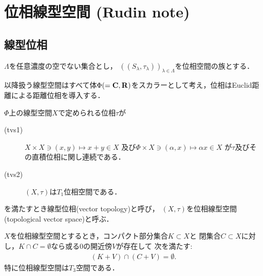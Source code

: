 \section{位相線型空間 (Rudin note)}
\subsection{線型位相}
	\begin{screen}
		\begin{thm}[多変数連続写像は一変数写像として連続]
		\label{thm:multivariable_continuous_mapping_is_one_variable_continuous}
			$\Lambda$を任意濃度の空でない集合とし，
			$\left( (S_\lambda,\tau_\lambda) \right)_{\lambda \in \Lambda}$を位相空間の族とする．
			
		\end{thm}
	\end{screen}
	
	以降扱う線型空間はすべて体$\Phi (=\mathbf{C},\mathbf{R})$をスカラーとして考え，位相はEuclid距離による距離位相を導入する．
	
	\begin{screen}
		\begin{dfn}[位相線型空間]\label{def:topological_vector_space}
			$\Phi$上の線型空間$X$で定められる位相$\tau$が
			\begin{description}
				\item[(tvs1)] $X \times X \ni (x,y) \longmapsto x+y \in X$
					及び$\Phi \times X \ni (\alpha,x) \longmapsto \alpha x \in X$
					が$\tau$及びその直積位相に関し連続である．
				\item[(tvs2)]
					$(X,\tau)$は$T_1$位相空間である．
			\end{description}
			を満たすとき線型位相(vector topology)と呼び，
			$(X,\tau)$を位相線型空間(topological vector space)と呼ぶ．
		\end{dfn}
	\end{screen}
	
	\begin{screen}
		\begin{thm}[位相線型空間は$T_3$]\label{thm:tvs_T_3_space}
			$X$を位相線型空間とするとき，コンパクト部分集合$K \subset X$と
			閉集合$C \subset X$に対し，$K \cap C = \emptyset$なら或る0の開近傍$V$が存在して
			次を満たす:
			\begin{align}
				(K + V) \cap (C + V) = \emptyset.
				\label{eq:thm_tvs_T_3_space}
			\end{align}
			特に位相線型空間は$T_3$空間である．
		\end{thm}
	\end{screen}
	
